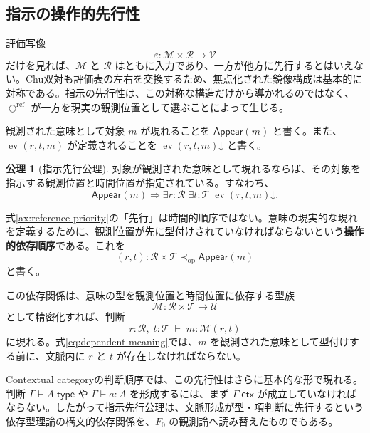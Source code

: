 \documentclass[a4paper,11pt]{ltjsarticle}
\theoremstyle{definition}
\newtheorem{axiom}[definition]{公理}
\theoremstyle{plain}
\newcommand{\CircleRef}{\bigcirc^{\mathrm{ref}}}
\newcommand{\Obj}{\mathcal M}
\newcommand{\Obs}{\mathcal R}
\newcommand{\Time}{\mathcal T}
\newcommand{\Val}{\mathcal V}
\begin{document}
\subsection{指示の操作的先行性}

評価写像
\begin{equation}
 \varepsilon:\Obj\times\Obs\longrightarrow\Val
\end{equation}
だけを見れば、$\Obj$ と $\Obs$ はともに入力であり、一方が他方に先行するとはいえない。Chu双対も評価表の左右を交換するため、無点化された鏡像構成は基本的に対称である。指示の先行性は、この対称な構造だけから導かれるのではなく、$\CircleRef$ が一方を現実の観測位置として選ぶことによって生じる。

観測された意味として対象 $m$ が現れることを $\mathsf{Appear}(m)$ と書く。また、$\operatorname{ev}(r,t,m)$ が定義されることを $\operatorname{ev}(r,t,m)\mathord\downarrow$ と書く。

\begin{axiom}[指示先行公理]
対象が観測された意味として現れるならば、その対象を指示する観測位置と時間位置が指定されている。すなわち、
\begin{equation}
 \mathsf{Appear}(m)
 \Longrightarrow
 \exists r:\Obs\;\exists t:\Time\;
 \operatorname{ev}(r,t,m)\mathord\downarrow .
 \label{ax:reference-priority}
\end{equation}
\end{axiom}

式\eqref{ax:reference-priority}の「先行」は時間的順序ではない。意味の現実的な現れを定義するために、観測位置が先に型付けされていなければならないという\textbf{操作的依存順序}である。これを
\begin{equation}
 (r,t):\Obs\times\Time
 \prec_{\mathrm{op}}
 \mathsf{Appear}(m)
\end{equation}
と書く。

この依存関係は、意味の型を観測位置と時間位置に依存する型族
\begin{equation}
 \mathcal M:\Obs\times\Time\longrightarrow\mathcal U
\end{equation}
として精密化すれば、判断
\begin{equation}
 r:\Obs,\;t:\Time
 \;\vdash\;
 m:\mathcal M(r,t)
 \label{eq:dependent-meaning}
\end{equation}
に現れる。式\eqref{eq:dependent-meaning}では、$m$ を観測された意味として型付けする前に、文脈内に $r$ と $t$ が存在しなければならない。

Contextual categoryの判断順序では、この先行性はさらに基本的な形で現れる。判断 $\Gamma\vdash A\;\mathsf{type}$ や $\Gamma\vdash a:A$ を形成するには、まず $\Gamma\;\mathsf{ctx}$ が成立していなければならない。したがって指示先行公理は、文脈形成が型・項判断に先行するという依存型理論の構文的依存関係を、$F_0$ の観測論へ読み替えたものでもある。
\end{document}
